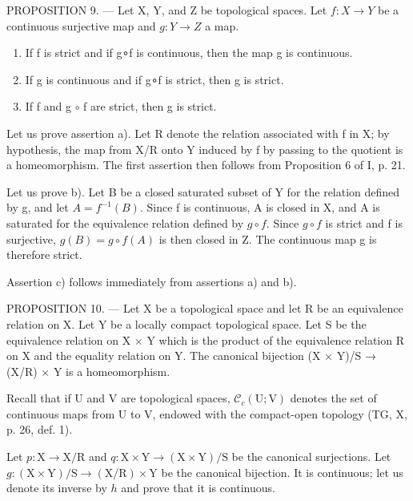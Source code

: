 PROPOSITION 9. --- Let X, Y, and Z be topological spaces. Let \(f\colon X \to Y\) be a continuous surjective map and \(g\colon Y \to Z\) a map.

\begin{enumerate}
\def\labelenumi{\alph{enumi})}
\item
If f is strict and if g∘f is continuous, then the map g is continuous.
\item
If g is continuous and if g∘f is strict, then g is strict.
\item
If f and g \(\circ\) f are strict, then g is strict.
\end{enumerate}

Let us prove assertion a). Let R denote the relation associated with f in X; by hypothesis, the map from X/R onto Y induced by f by passing to the quotient is a homeomorphism. The first assertion then follows from Proposition 6 of I, p. 21.

Let us prove b). Let B be a closed saturated subset of Y for the relation defined by g, and let \(A = f^{-1}(B)\). Since f is continuous, A is closed in X, and A is saturated for the equivalence relation defined by \(g \circ f\). Since \(g \circ f\) is strict and f is surjective, \(g(B) = g \circ f(A)\) is then closed in Z. The continuous map g is therefore strict.

Assertion c) follows immediately from assertions a) and b).

PROPOSITION 10. --- Let X be a topological space and let R be an equivalence relation on X. Let Y be a locally compact topological space. Let S be the equivalence relation on X × Y which is the product of the equivalence relation R on X and the equality relation on Y. The canonical bijection (X × Y)/S → (X/R) × Y is a homeomorphism.

Recall that if U and V are topological spaces, \(\mathcal{C}_{c}(\mathrm{U};\mathrm{V})\) denotes the set of continuous maps from U to V, endowed with the compact-open topology (TG, X, p. 26, def. 1).

Let \(p \colon \mathrm{X} \to \mathrm{X} / \mathrm{R}\) and \(q \colon \mathrm{X} \times \mathrm{Y} \to (\mathrm{X} \times \mathrm{Y}) / \mathrm{S}\) be the canonical surjections. Let \(g \colon (\mathrm{X} \times \mathrm{Y}) / \mathrm{S} \to (\mathrm{X} / \mathrm{R}) \times \mathrm{Y}\) be the canonical bijection. It is continuous; let us denote its inverse by \(h\) and prove that it is continuous.

